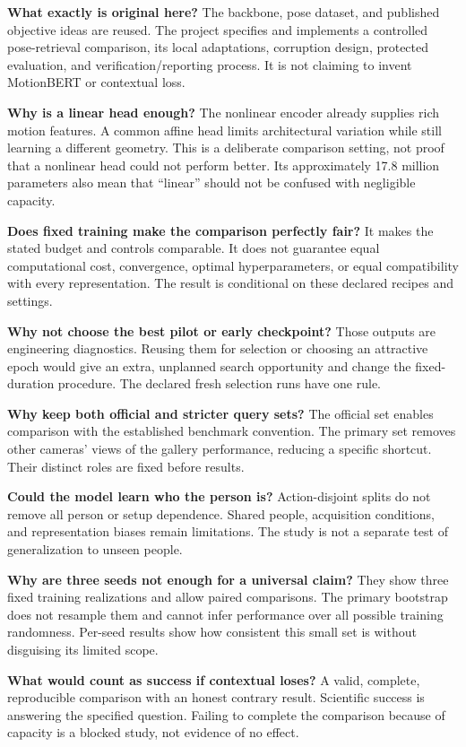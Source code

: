 \textbf{What exactly is original here?}
The backbone, pose dataset, and published objective ideas are reused. The project
specifies and implements a controlled pose-retrieval comparison, its local
adaptations, corruption design, protected evaluation, and verification/reporting
process. It is not claiming to invent MotionBERT or contextual loss.

\textbf{Why is a linear head enough?}
The nonlinear encoder already supplies rich motion features. A common affine
head limits architectural variation while still learning a different geometry.
This is a deliberate comparison setting, not proof that a nonlinear head could
not perform better. Its approximately 17.8 million parameters also mean that
``linear'' should not be confused with negligible capacity.

\textbf{Does fixed training make the comparison perfectly fair?}
It makes the stated budget and controls comparable. It does not guarantee
equal computational cost, convergence, optimal hyperparameters, or equal
compatibility with every representation. The result is conditional on these
declared recipes and settings.

\textbf{Why not choose the best pilot or early checkpoint?}
Those outputs are engineering diagnostics. Reusing them for selection or choosing
an attractive epoch would give an extra, unplanned search opportunity and change
the fixed-duration procedure. The declared fresh selection runs have one rule.

\textbf{Why keep both official and stricter query sets?}
The official set enables comparison with the established benchmark convention.
The primary set removes other cameras' views of the gallery performance,
reducing a specific shortcut. Their distinct roles are fixed before results.

\textbf{Could the model learn who the person is?}
Action-disjoint splits do not remove all person or setup dependence. Shared
people, acquisition conditions, and representation biases remain limitations.
The study is not a separate test of generalization to unseen people.

\textbf{Why are three seeds not enough for a universal claim?}
They show three fixed training realizations and allow paired comparisons.
The primary bootstrap does not resample them and cannot infer performance over
all possible training randomness. Per-seed results show how consistent this
small set is without disguising its limited scope.

\textbf{What would count as success if contextual loses?}
A valid, complete, reproducible comparison with an honest contrary result.
Scientific success is answering the specified question. Failing to complete
the comparison because of capacity is a blocked study, not evidence of no effect.

